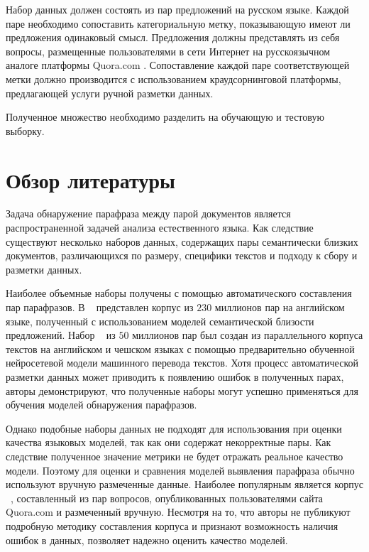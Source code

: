 \documentclass[a4paper,14pt]{extarticle}
\begin{document}
Набор данных должен состоять из пар предложений на русском языке. Каждой паре необходимо сопоставить категориальную метку, показывающую имеют ли предложения одинаковый смысл.
Предложения должны представлять из себя вопросы, размещенные пользователями в сети Интернет на русскоязычном аналоге платформы Quora.com . %
Сопоставление каждой паре соответствующей метки должно производится с использованием краудсорнинговой платформы, предлагающей услуги ручной разметки данных.

Полученное множество необходимо разделить на обучающую и тестовую выборку.

\section{Обзор литературы}

Задача обнаружение парафраза между парой документов является распространенной задачей анализа естественного языка.
Как следствие существуют несколько наборов данных, содержащих пары семантически близких документов, различающихся по размеру, специфики текстов и подходу к сбору и разметки данных.

Наиболее объемные наборы получены с помощью автоматического составления пар парафразов.
В ~\autocite{ganitkevitch2013ppdb} представлен корпус из $230$ миллионов пар на английском языке, полученный с использованием моделей семантической близости предложений.
Набор ~\autocite{wieting2017paranmt} из $50$ миллионов пар был создан из параллельного корпуса текстов на английском и чешском языках с помощью предварительно обученной нейросетевой модели машинного перевода текстов.
Хотя процесс автоматической разметки данных может приводить к появлению ошибок в полученных парах, авторы демонстрируют, что полученные наборы могут успешно применяться для обучения моделей обнаружения парафразов.

Однако подобные наборы данных не подходят для использования при оценки качества языковых моделей, так как они содержат некорректные пары. Как следствие полученное значение метрики не будет отражать реальное качество модели.
Поэтому для оценки и сравнения моделей выявления парафраза обычно используют вручную размеченные данные.
Наиболее популярным является корпус ~\autocite{iyer_csernai_dandekar_2017}, составленный из пар вопросов, опубликованных пользователями сайта Quora.com и размеченный вручную.
Несмотря на то, что авторы не публикуют подробную методику составления корпуса и признают возможность наличия ошибок в данных, позволяет надежно оценить качество моделей.
\end{document}
